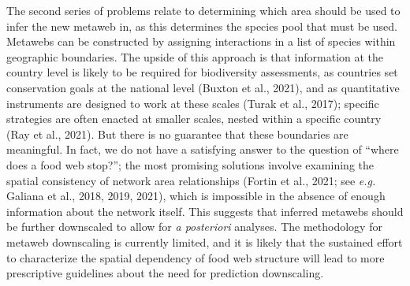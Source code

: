 \documentclass[11pt]{article}
\begin{document}
The second series of problems relate to determining which area should be
used to infer the new metaweb in, as this determines the species pool
that must be used. Metawebs can be constructed by assigning interactions
in a list of species within geographic boundaries. The upside of this
approach is that information at the country level is likely to be
required for biodiversity assessments, as countries set conservation
goals at the national level (Buxton et al., 2021), and as quantitative
instruments are designed to work at these scales (Turak et al., 2017);
specific strategies are often enacted at smaller scales, nested within a
specific country (Ray et al., 2021). But there is no guarantee that
these boundaries are meaningful. In fact, we do not have a satisfying
answer to the question of ``where does a food web stop?''; the most
promising solutions involve examining the spatial consistency of network
area relationships (Fortin et al., 2021; see \emph{e.g.} Galiana et al.,
2018, 2019, 2021), which is impossible in the absence of enough
information about the network itself. This suggests that inferred
metawebs should be further downscaled to allow for \emph{a posteriori}
analyses. The methodology for metaweb downscaling is currently limited,
and it is likely that the sustained effort to characterize the spatial
dependency of food web structure will lead to more prescriptive
guidelines about the need for prediction downscaling.
\end{document}
